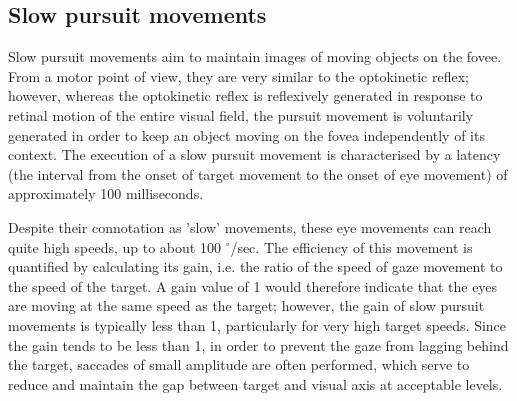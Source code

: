 \documentclass[11pt]{article}
\begin{document}
\subsection{Slow pursuit movements}
Slow pursuit movements aim to maintain images of moving objects on the fovee. From a motor point of view, they are very similar to the optokinetic reflex; however, whereas the optokinetic reflex is reflexively generated in response to retinal motion of the entire visual field, the pursuit movement is voluntarily generated in order to keep an object moving on the fovea independently of its context. The execution of a slow pursuit movement is characterised by a latency (the interval from the onset of target movement to the onset of eye movement) of approximately 100 milliseconds.

Despite their connotation as 'slow' movements, these eye movements can reach quite high speeds, up to about 100 $^{\circ}$/sec. The efficiency of this movement is quantified by calculating its gain, i.e. the ratio of the speed of gaze movement to the speed of the target. A gain value of 1 would therefore indicate that the eyes are moving at the same speed as the target; however, the gain of slow pursuit movements is typically less than 1, particularly for very high target speeds. Since the gain tends to be less than 1, in order to prevent the gaze from lagging behind the target, saccades of small amplitude are often performed, which serve to reduce and maintain the gap between target and visual axis at acceptable levels.
\end{document}
